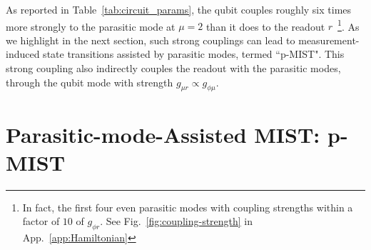 \documentclass[%
reprint,
superscriptaddress,
 amsmath,amssymb,
 aps,
 prx,
longbibliography,
floatfix,
]{revtex4-2}
\begin{document}
As reported in Table~\ref{tab:circuit_params}, the qubit couples roughly six times more strongly to the parasitic mode at $\mu=2$ than it does to the readout $r$~\footnote{In fact, the first four even parasitic modes with coupling strengths within a factor of $10$ of $g_{\phi r}$. See Fig.~\ref{fig:coupling-strength} in App.~\ref{app:Hamiltonian}}. As we highlight in the next section, such strong couplings can lead to measurement-induced state transitions assisted by parasitic modes, termed ``p-MIST". This strong coupling also indirectly couples the readout with the parasitic modes, through the qubit mode with strength $g_{\mu r}\propto g_{\phi\mu}$. 

\section{Parasitic-mode-Assisted MIST: p-MIST}\label{sec:MIST}
\end{document}
